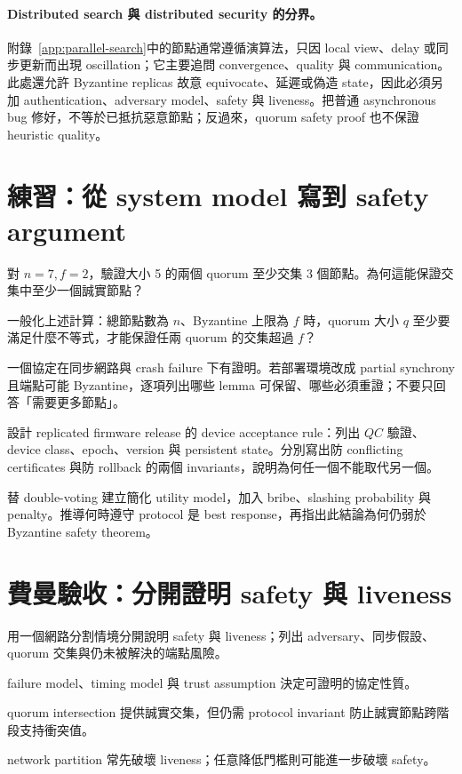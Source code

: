 \documentclass[11pt,a4paper,oneside,openany]{book}
\begin{document}
\paragraph{Distributed search 與 distributed security 的分界。}
附錄~\ref{app:parallel-search}中的節點通常遵循演算法，只因 local view、delay 或同步更新而出現 oscillation；它主要追問 convergence、quality 與 communication。此處還允許 Byzantine replicas 故意 equivocate、延遲或偽造 state，因此必須另加 authentication、adversary model、safety 與 liveness。把普通 asynchronous bug 修好，不等於已抵抗惡意節點；反過來，quorum safety proof 也不保證 heuristic quality。

\section{練習：從 system model 寫到 safety argument}
\begin{exercise}
對 $n=7,f=2$，驗證大小 5 的兩個 quorum 至少交集 3 個節點。為何這能保證交集中至少一個誠實節點？
\end{exercise}
\begin{exercise}
一般化上述計算：總節點數為 $n$、Byzantine 上限為 $f$ 時，quorum 大小 $q$ 至少要滿足什麼不等式，才能保證任兩 quorum 的交集超過 $f$？
\end{exercise}
\begin{exercise}
一個協定在同步網路與 crash failure 下有證明。若部署環境改成 partial synchrony 且端點可能 Byzantine，逐項列出哪些 lemma 可保留、哪些必須重證；不要只回答「需要更多節點」。
\end{exercise}
\begin{exercise}
設計 replicated firmware release 的 device acceptance rule：列出 $QC$ 驗證、device class、epoch、version 與 persistent state。分別寫出防 conflicting certificates 與防 rollback 的兩個 invariants，說明為何任一個不能取代另一個。
\end{exercise}
\begin{exercise}
替 double-voting 建立簡化 utility model，加入 bribe、slashing probability 與 penalty。推導何時遵守 protocol 是 best response，再指出此結論為何仍弱於 Byzantine safety theorem。
\end{exercise}

\section{費曼驗收：分開證明 safety 與 liveness}
\begin{feynmancheck}
用一個網路分割情境分開說明 safety 與 liveness；列出 adversary、同步假設、quorum 交集與仍未被解決的端點風險。
\end{feynmancheck}
\begin{chapterrecap}
\item failure model、timing model 與 trust assumption 決定可證明的協定性質。
\item quorum intersection 提供誠實交集，但仍需 protocol invariant 防止誠實節點跨階段支持衝突值。
\item network partition 常先破壞 liveness；任意降低門檻則可能進一步破壞 safety。
\end{chapterrecap}
\end{document}
